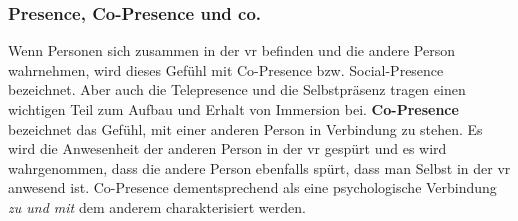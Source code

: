 \documentclass[a4paper,11pt]{article}%
\renewcommand{\\}{\vspace*{0.5\baselineskip} \newline}
\begin{document}
		\subsubsection{Presence, Co-Presence und co.}
Wenn Personen sich zusammen in der \ac{vr} befinden und die andere Person wahrnehmen, wird dieses Gefühl mit \dq{}Co-Presence\dq{} bzw. \dq{}Social-Presence\dq{} bezeichnet. Aber auch die \dq{}Telepresence\dq{} und die \dq{}Selbstpräsenz\dq{} tragen einen wichtigen Teil zum Aufbau und Erhalt von Immersion bei. \citep{schuemie2001research}\\
\textbf{\dq Co-Presence\dq{}} bezeichnet das Gefühl, mit einer anderen Person in Verbindung zu stehen.
Es wird die Anwesenheit der anderen Person in der \ac{vr} gespürt und es wird wahrgenommen, dass die andere Person ebenfalls spürt, dass man Selbst in der \ac{vr} anwesend ist. 
Co-Presence dementsprechend als eine psychologische Verbindung \textit{zu und mit} dem anderem charakterisiert werden. \citep[179-182]{ijsselsteijn2001presence}
\end{document}
